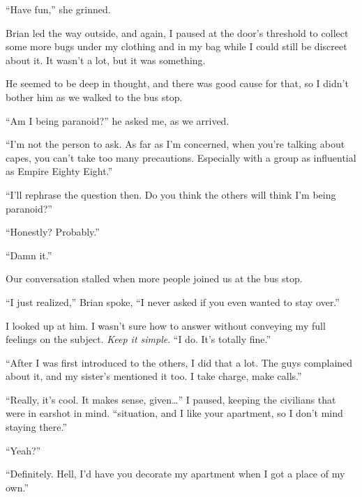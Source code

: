 ``Have fun,'' she grinned.



Brian led the way outside, and again, I paused at the door's threshold to collect some more bugs under my clothing and in my bag while I could still be discreet about it.  It wasn't a lot, but it was something.



He seemed to be deep in thought, and there was good cause for that, so I didn't bother him as we walked to the bus stop.



``Am I being paranoid?'' he asked me, as we arrived.



``I'm not the person to ask.  As far as I'm concerned, when you're talking about capes, you can't take too many precautions.  Especially with a group as influential as Empire Eighty Eight.''



``I'll rephrase the question then.  Do you think the others will think I'm being paranoid?''



``Honestly?  Probably.''



``Damn it.''



Our conversation stalled when more people joined us at the bus stop.



``I just realized,'' Brian spoke, ``I never asked if you even wanted to stay over.''



I looked up at him.  I wasn't sure how to answer without conveying my full feelings on the subject.  \emph{Keep it simple}.  ``I do.  It's totally fine.''



``After I was first introduced to the others, I did that a lot.  The guys complained about it, and my sister's mentioned it too.  I take charge, make calls.''



``Really, it's cool.  It makes sense, given\ldots'' I paused, keeping the civilians that were in earshot in mind.  ``\ldotsthe situation, and I like your apartment, so I don't mind staying there.''



``Yeah?''



``Definitely.  Hell, I'd have you decorate my apartment when I got a place of my own.''



